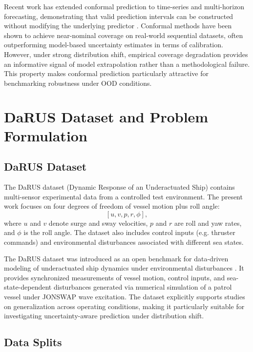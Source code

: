 \documentclass[a4paper,fleqn]{cas-sc}
\begin{document}
Recent work has extended conformal prediction to time-series and multi-horizon forecasting, demonstrating that valid prediction intervals can be constructed without modifying the underlying predictor \cite{stankeviciute2021conformal}. Conformal methods have been shown to achieve near-nominal coverage on real-world sequential datasets, often outperforming model-based uncertainty estimates in terms of calibration. However, under strong distribution shift, empirical coverage degradation provides an informative signal of model extrapolation rather than a methodological failure. This property makes conformal prediction particularly attractive for benchmarking robustness under OOD conditions.


\section{DaRUS Dataset and Problem Formulation}

\subsection{DaRUS Dataset}

The DaRUS dataset (Dynamic Response of an Underactuated Ship) contains multi-sensor experimental data from a controlled test environment. The present work focuses on four degrees of freedom of vessel motion plus roll angle:
\[
[u, v, p, r, \phi],
\]
where \(u\) and \(v\) denote surge and sway velocities, \(p\) and \(r\) are roll and yaw rates, and \(\phi\) is the roll angle. The dataset also includes control inputs (e.g. thruster commands) and environmental disturbances associated with different sea states.

The DaRUS dataset was introduced as an open benchmark for data-driven modeling of underactuated ship dynamics under environmental disturbances \cite{baier2022darus}. It provides synchronized measurements of vessel motion, control inputs, and sea-state-dependent disturbances generated via numerical simulation of a patrol vessel under JONSWAP wave excitation. The dataset explicitly supports studies on generalization across operating conditions, making it particularly suitable for investigating uncertainty-aware prediction under distribution shift.


\subsection{Data Splits}
\end{document}
